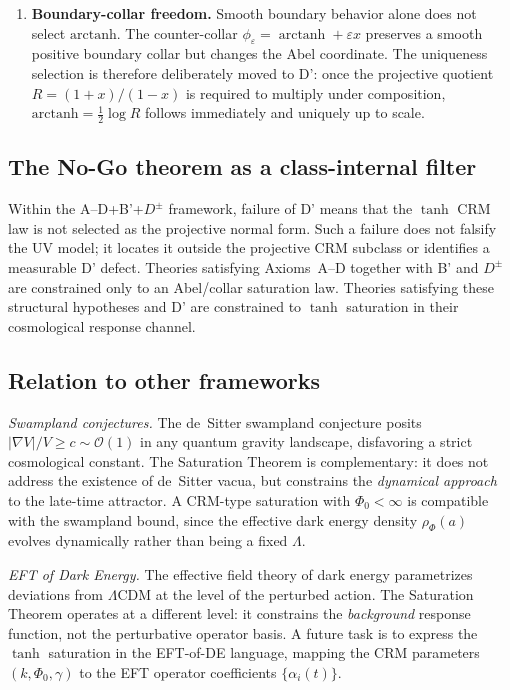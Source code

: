\documentclass[aps,prd,twocolumn,superscriptaddress,nofootinbib]{revtex4-2}
\begin{document}
\begin{enumerate}
\item \textbf{Boundary-collar freedom.} Smooth boundary behavior alone does not select $\mathrm{arctanh}$. The counter-collar $\phi_\varepsilon=\operatorname{arctanh}+\varepsilon x$ preserves a smooth positive boundary collar but changes the Abel coordinate. The uniqueness selection is therefore deliberately moved to D': once the projective quotient $R=(1+x)/(1-x)$ is required to multiply under composition, $\mathrm{arctanh}=\frac12\log R$ follows immediately and uniquely up to scale.
\end{enumerate}

\subsection{The No-Go theorem as a class-internal filter}

Within the A--D+B'+$D^\pm$ framework, failure of D' means that the $\tanh$ CRM law is not selected as the projective normal form. Such a failure does not falsify the UV model; it locates it outside the projective CRM subclass or identifies a measurable D' defect. Theories satisfying Axioms~A--D together with B' and $D^\pm$ are constrained only to an Abel/collar saturation law. Theories satisfying these structural hypotheses and D' are constrained to $\tanh$ saturation in their cosmological response channel.

\subsection{Relation to other frameworks}

\textit{Swampland conjectures.} The de~Sitter swampland conjecture \cite{Obied2018} posits $|\nabla V|/V \geq c \sim \mathcal{O}(1)$ in any quantum gravity landscape, disfavoring a strict cosmological constant. The Saturation Theorem is complementary: it does not address the existence of de~Sitter vacua, but constrains the \textit{dynamical approach} to the late-time attractor. A CRM-type saturation with $\Phi_0 < \infty$ is compatible with the swampland bound, since the effective dark energy density $\rho_\Phi(a)$ evolves dynamically rather than being a fixed $\Lambda$.

\textit{EFT of Dark Energy.} The effective field theory of dark energy \cite{Gubitosi2013} parametrizes deviations from $\Lambda$CDM at the level of the perturbed action. The Saturation Theorem operates at a different level: it constrains the \textit{background} response function, not the perturbative operator basis. A future task is to express the $\tanh$ saturation in the EFT-of-DE language, mapping the CRM parameters $(k, \Phi_0, \gamma)$ to the EFT operator coefficients $\{\alpha_i(t)\}$.
\end{document}
